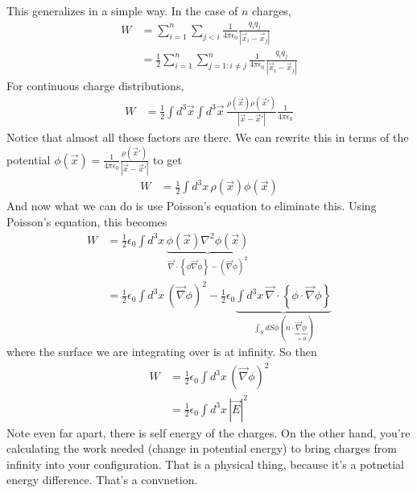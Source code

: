 This generalizes in a simple way.
In the case of $n$ charges,
\begin{align}
    W &=
    \sum_{i=1}^{n}
    \sum_{j<i}
    \frac{1}{4\pi\epsilon_0}
    \frac{q_i q_j}{\left| \vec{x}_i - \vec{x}_j \right|}\\
    &=
    \frac{1}{2}
    \sum_{i=1}^{n}
    \sum_{j=1: i\ne j}^{n}
    \frac{1}{4\pi\epsilon_0}
    \frac{q_i q_j}{\left| \vec{x}_i - \vec{x}_j \right|}
\end{align}
For continuous charge distributions,
\begin{align}
    W &=
    \frac{1}{2}
    \int d^3\vec{x}
    \int d^3\vec{x}\,
    \frac{\rho\left( \vec{x} \right) \rho\left( \vec{x}' \right)}{
    \left| \vec{x} - \vec{x}' \right|
    }
    \frac{1}{4\pi\epsilon_0}
\end{align}
Notice that almost all those factors are there.
We can rewrite this in terms of the potential
$\phi(\vec{x})=\frac{1}{4\pi\epsilon_0} \frac{\rho(\vec{x}')}{
\left|\vec{x} - \vec{x}'\right|}$
to get
\begin{align}
    W &=
    \frac{1}{2}
    \int d^3x\,
    \rho\left( \vec{x} \right)
    \phi\left( \vec{x} \right)
\end{align}
And now what we can do is use Poisson's equation to eliminate this.
Using Poisson's equation,
this becomes
\begin{align}
    W &=\frac{1}{2}\epsilon_0 \int d^3x\,
    \underbrace{\phi\left( \vec{x} \right) \nabla^2 \phi(\vec{x})}_{
    \vec{\nabla}\cdot\left\{ 
    \phi \vec{\nabla} \phi
    \right\}
    -
    \left( \vec{\nabla} \phi \right)^2
    }\\
    &=
    \frac{1}{2}\epsilon_0 \int d^3x\,
    \left( \vec{\nabla}\phi \right)^2
    -
    \frac{1}{2}\epsilon_0
    \underbrace{
    \int d^3x\,
    \vec{\nabla}\cdot\left\{ 
    \phi \cdot \vec{\nabla} \phi
    \right\}
    }_{
    \int_S dS \phi\left( 
    n\cdot \underbrace{\vec{\nabla}\phi}_{=0}
    \right)
    }
\end{align}
where the surface we are integrating over is at infinity.
So then
\begin{align}
    W &=
    \frac{1}{2} \epsilon_0 \int d^3x\,
    \left( \vec{\nabla}\phi \right)^2\\
    &=
    \frac{1}{2}
    \epsilon_0
    \int d^3x\,
    \left|\vec{E}\right|^2
\end{align}
Note even far apart,
there is self energy of the charges.
On the other hand,
you're calculating the work needed (change in potential energy)
to bring charges from infinity into your configuration.
That is a physical thing,
because it's a potnetial energy difference.
That's a convnetion.

